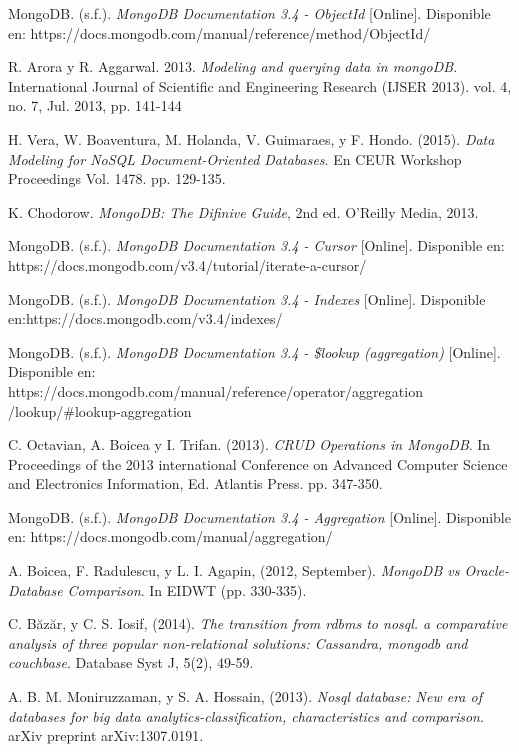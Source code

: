 \documentclass[conference,compsoc]{sty/IEEEtran}
\begin{document}
\begin{thebibliography}{1}
  
MongoDB. (s.f.). \emph{MongoDB Documentation 3.4 - ObjectId} [Online]. Disponible en: https://docs.mongodb.com/manual/reference/method/ObjectId/

R. Arora y R. Aggarwal. 2013. \emph{Modeling and querying data in mongoDB}. International Journal of Scientific and Engineering Research (IJSER 2013). vol. 4, no. 7, Jul. 2013, pp. 141-144

H. Vera, W. Boaventura, M. Holanda, V. Guimaraes, y F. Hondo. (2015). \emph{Data Modeling for NoSQL Document-Oriented Databases}. En CEUR Workshop Proceedings Vol. 1478. pp. 129-135.

K. Chodorow. \emph{MongoDB: The Difinive Guide}, 2nd ed. O'Reilly Media, 2013.

MongoDB. (s.f.). \emph{MongoDB Documentation 3.4 - Cursor} [Online]. Disponible en: https://docs.mongodb.com/v3.4/tutorial/iterate-a-cursor/

MongoDB. (s.f.). \emph{MongoDB Documentation 3.4 - Indexes} [Online]. Disponible en:https://docs.mongodb.com/v3.4/indexes/

MongoDB. (s.f.). \emph{MongoDB Documentation 3.4 - \$lookup (aggregation)} [Online]. Disponible en: https://docs.mongodb.com/manual/reference/operator/aggregation
/lookup/\#lookup-aggregation 

C. Octavian, A. Boicea y I. Trifan. (2013). \emph{CRUD Operations in MongoDB}. In Proceedings of the 2013 international Conference on Advanced Computer Science and Electronics Information, Ed. Atlantis Press. pp. 347-350.

MongoDB. (s.f.). \emph{MongoDB Documentation 3.4 - Aggregation} [Online]. Disponible en: https://docs.mongodb.com/manual/aggregation/

A. Boicea, F. Radulescu, y L. I. Agapin, (2012, September). \emph{MongoDB vs Oracle-Database Comparison}. In EIDWT (pp. 330-335).

C. Băzăr, y C. S. Iosif, (2014). \emph{The transition from rdbms to nosql. a comparative analysis of three popular non-relational solutions: Cassandra, mongodb and couchbase}. Database Syst J, 5(2), 49-59.

A. B. M. Moniruzzaman, y S. A. Hossain, (2013). \emph{Nosql database: New era of databases for big data analytics-classification, characteristics and comparison}. arXiv preprint arXiv:1307.0191.


\end{thebibliography}
\end{document}
